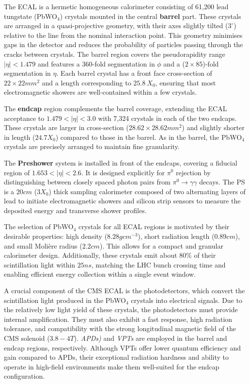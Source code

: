 The ECAL is a hermetic homogeneous calorimeter consisting of 61,200 lead tungstate (PbWO$_4$) crystals mounted in the central \textbf{barrel} part. These crystals are arranged in a quasi-projective geometry, with their axes slightly tilted ($3^\circ$) relative to the line from the nominal interaction point. This geometry minimises gaps in the detector and reduces the probability of particles passing through the cracks between crystals. The barrel region covers the pseudorapidity range $|\eta| < 1.479$ and features a 360-fold segmentation in $\phi$ and a ($2 \times 85$)-fold segmentation in $\eta$. Each barrel crystal has a front face cross-section of $22 \times 22\unit{mm}^2$ and a length corresponding to $25.8~X_0$, ensuring that most electromagnetic showers are well-contained within a few crystals.

The \textbf{endcap} region complements the barrel coverage, extending the ECAL acceptance to $1.479 < |\eta| < 3.0$ with 7,324 crystals in each of the two endcaps. These crystals are larger in cross-section ($28.62 \times 28.62\unit{mm}^2$) and slightly shorter in length ($24.7 X_0$) compared to those in the barrel. As in the barrel, the PbWO$_4$ crystals are precisely arranged to maintain fine granularity.

The \textbf{Preshower} system is installed in front of the endcaps, covering a fiducial region of $1.653 < |\eta| < 2.6$. It is designed explicitly for $\pi^0$ rejection by distinguishing between closely spaced photon pairs from $\pi^0 \to \gamma \gamma$ decays. The PS is a $20\unit{cm}$ ($3X_0$) thick sampling calorimeter composed of two alternating layers of lead to initiate electromagnetic showers and silicon strip sensors to measure the deposited energy and transverse shower profiles.

The selection of PbWO$_4$ crystals for all ECAL regions is motivated by their desirable properties: high density ($8.28\unit{gcm}^{-3}$), short radiation length ($0.89\unit{cm}$), and small Moli\`ere radius ($2.2\unit{cm}$). This allows for a compact and granular calorimeter design. Additionally, these crystals emit about 80\% of their scintillation light within $25\unit{ns}$, matching the LHC bunch crossing time and enabling efficient energy collection within a single event window.

A crucial component of the CMS ECAL is the photodetectors, which convert the scintillation light produced in the PbWO$_4$ crystals into electrical signals. Due to the relatively low light yield of these crystals, the photodetectors must provide internal amplification. They must also exhibit a fast response, high radiation tolerance, and compatibility with the strong longitudinal magnetic field of the CMS solenoid ($3.8-4\unit{T}$). \textit{\ac{APDs})} and \textit{\ac{VPTs}} are employed in the barrel and endcap regions, respectively. Although VPTs offer lower quantum efficiency and gain compared to APDs, their exceptional radiation hardness and ability to operate in high-field environments make them well-suited for the endcap configuration.

